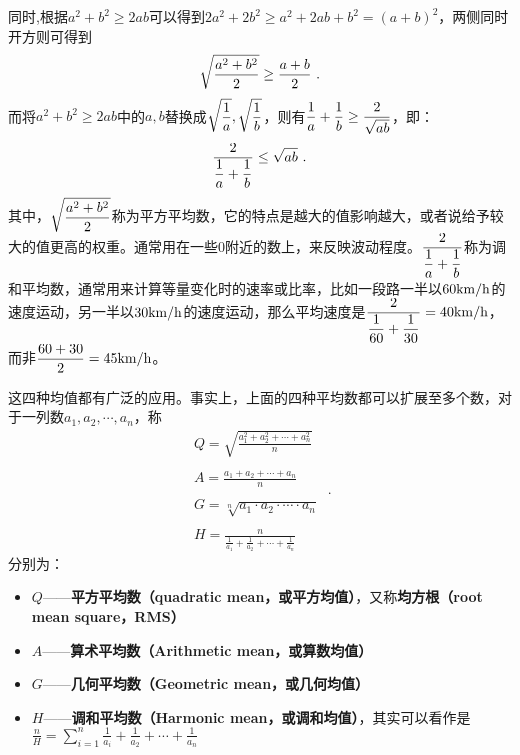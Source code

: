 同时,根据$a^2+b^2\geq2ab$可以得到$2a^2+2b^2\geq a^2+2ab+b^2=(a+b)^2$，两侧同时开方则可得到
\begin{equation}
\sqrt{a^2+b^2\over2}\geq{a+b\over2}~.
\end{equation}
而将$a^2+b^2\geq2ab$中的$a,b$替换成$\displaystyle\sqrt{1\over a},\sqrt{1\over b}$，则有$\displaystyle{1\over a}+{1\over b}\geq{2\over\sqrt{ab}}$，即：
\begin{equation}
{2\over\displaystyle{1\over a}+\displaystyle{1\over b}}\leq\sqrt{ab}~.
\end{equation}
其中，$\displaystyle \sqrt{a^2+b^2\over2}$称为平方平均数，它的特点是越大的值影响越大，或者说给予较大的值更高的权重。通常用在一些$0$附近的数上，来反映波动程度。$\displaystyle{2\over\displaystyle{1\over a}+\displaystyle{1\over b}}$称为调和平均数，通常用来计算等量变化时的速率或比率，比如一段路一半以$60{\rm km/h}$的速度运动，另一半以$30{\rm km/h}$的速度运动，那么平均速度是$\displaystyle \frac{2}{\displaystyle\frac{1}{60} + \frac{1}{30}} = 40{\rm km/h}$，而非$\displaystyle{60+30\over2}=45{\rm km/h}$。

这四种均值都有广泛的应用。事实上，上面的四种平均数都可以扩展至多个数，对于一列数$a_1,a_2,\cdots,a_n$，称
\begin{equation}
\begin{array}{c} 
\displaystyle Q = \sqrt{\frac{a_1^2 + a_2^2 + \cdots + a_n^2}{n}}\\\\
\displaystyle A = \frac{a_1 + a_2 + \cdots + a_n}{n}\\\\
\displaystyle G = \sqrt[n]{a_1 \cdot a_2 \cdot \cdots \cdot a_n}\\\\
\displaystyle H = \frac{n}{\frac{1}{a_1} + \frac{1}{a_2} + \cdots + \frac{1}{a_n}}
\end{array}~.
\end{equation}
分别为：
\begin{itemize}
\item $Q$——\textbf{平方平均数（quadratic mean，或平方均值）}，又称\textbf{均方根（root mean square，RMS）}
\item $A$——\textbf{算术平均数（Arithmetic mean，或算数均值）}
\item $G$——\textbf{几何平均数（Geometric mean，或几何均值）}
\item $H$——\textbf{调和平均数（Harmonic mean，或调和均值）}，其实可以看作是$\displaystyle \frac{n}{H} = \sum_{i=1}^n\frac{1}{a_i} + \frac{1}{a_2} + \cdots + \frac{1}{a_n}$
\end{itemize}

